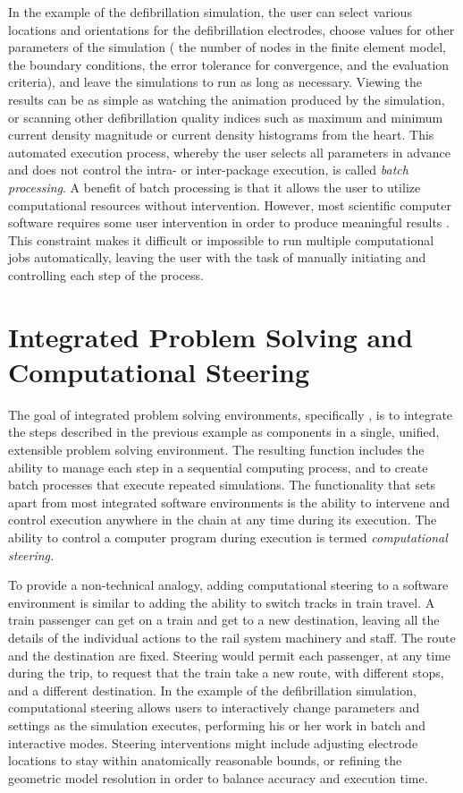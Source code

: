 In the example of the defibrillation simulation, the user can
select various locations and orientations for the defibrillation
electrodes, choose values for other parameters of the simulation
(\eg{} the number of nodes in the finite element model, the boundary
conditions, the error tolerance for convergence, and the evaluation
criteria), and leave the simulations to run as long as necessary.
Viewing the results can be as simple as watching the animation
produced by the simulation, or scanning other defibrillation quality
indices such as maximum and minimum current density magnitude or
current density histograms from the heart.  This automated execution
process, whereby the user selects all parameters in advance and
does not control the intra- or inter-package execution, is called
\emph{batch processing}.  A benefit of batch processing is
that it allows the user to utilize computational resources
without intervention.  However, most scientific computer software
 requires some user intervention in order to
produce meaningful results .  This constraint makes it difficult or
impossible to run multiple computational jobs automatically, leaving
the user with the task of manually initiating and controlling each
step of the process.

\section{Integrated Problem Solving and Computational Steering} 
\label{sec:con-steering} 

The goal of integrated problem solving environments, specifically
\SR{}, is to integrate the steps
described in the previous example as components in a single, unified,
extensible problem solving environment.  The resulting function
includes the ability to manage each step in a
sequential computing process, and to create batch processes that
execute repeated simulations. The functionality that sets
\SR{} apart from most integrated software environments
is the ability to intervene and control execution anywhere in the
chain at any time during its execution.  The ability to control a
computer program during execution is termed \emph{computational
  steering.}

To provide a non-technical analogy, adding computational steering to a
software environment is similar to adding the ability to 
switch tracks in train travel.  A train passenger can get on a train
and get to a new destination, leaving all the details of
the individual actions to the rail system machinery and staff. The route and the 
destination are fixed.  Steering would permit each
passenger, at any time during the trip,  to request that the train take a new route, with different
stops, and a different destination.  In the example
of the defibrillation simulation, computational steering allows users to interactively change parameters and settings as the
simulation executes, performing his or her work in batch and interactive
modes.  Steering interventions might include adjusting electrode
locations to stay within anatomically reasonable bounds, or refining
the geometric model resolution in order to balance accuracy and
execution time.

